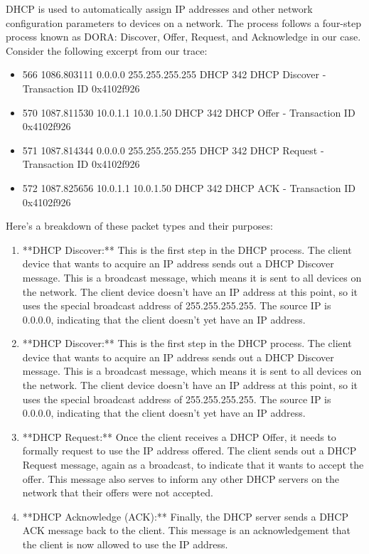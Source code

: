 DHCP is used to automatically assign IP addresses and other network configuration parameters to devices on a network. The process follows a four-step process known as DORA: Discover, Offer, Request, and Acknowledge in our case. Consider the following excerpt from our trace:

\begin{itemize}
    \item 566	1086.803111	0.0.0.0	255.255.255.255	DHCP	342	DHCP Discover - Transaction ID 0x4102f926
    \item 570	1087.811530	10.0.1.1	10.0.1.50	DHCP	342	DHCP Offer    - Transaction ID 0x4102f926
    \item 571	1087.814344	0.0.0.0	255.255.255.255	DHCP	342	DHCP Request  - Transaction ID 0x4102f926
    \item 572	1087.825656	10.0.1.1	10.0.1.50	DHCP	342	DHCP ACK      - Transaction ID 0x4102f926
\end{itemize}





Here's a breakdown of these packet types and their purposes:

\begin{enumerate}
    \item **DHCP Discover:** This is the first step in the DHCP process. The client device that wants to acquire an IP address sends out a DHCP Discover message. This is a broadcast message, which means it is sent to all devices on the network. The client device doesn't have an IP address at this point, so it uses the special broadcast address of 255.255.255.255. The source IP is 0.0.0.0, indicating that the client doesn't yet have an IP address.
    \item **DHCP Discover:** This is the first step in the DHCP process. The client device that wants to acquire an IP address sends out a DHCP Discover message. This is a broadcast message, which means it is sent to all devices on the network. The client device doesn't have an IP address at this point, so it uses the special broadcast address of 255.255.255.255. The source IP is 0.0.0.0, indicating that the client doesn't yet have an IP address.
    \item **DHCP Request:** Once the client receives a DHCP Offer, it needs to formally request to use the IP address offered. The client sends out a DHCP Request message, again as a broadcast, to indicate that it wants to accept the offer. This message also serves to inform any other DHCP servers on the network that their offers were not accepted.
    \item **DHCP Acknowledge (ACK):** Finally, the DHCP server sends a DHCP ACK message back to the client. This message is an acknowledgement that the client is now allowed to use the IP address.
\end{enumerate}




